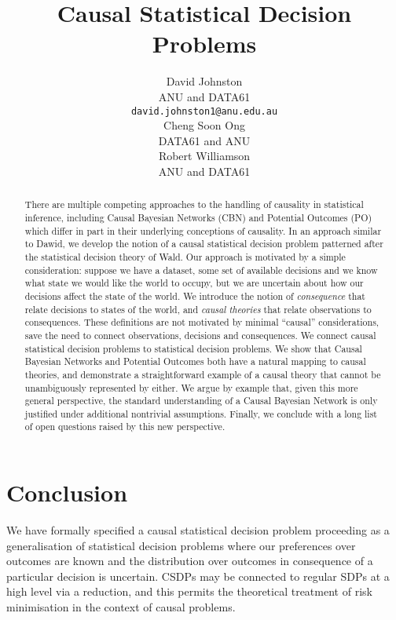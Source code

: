 \documentclass{article}
\title{Causal Statistical Decision Problems}
\author{%
  David Johnston \\
    ANU and DATA61\\
  \texttt{david.johnston1@anu.edu.au} \\
   \And
  Cheng Soon Ong\\
  DATA61 and ANU\\
   \And
   Robert Williamson \\
   ANU and DATA61\\
}
\theoremstyle{plain}
\theoremstyle{definition}
\begin{document}
\maketitle

\begin{abstract}
There are multiple competing approaches to the handling of causality in statistical inference, including Causal Bayesian Networks (CBN) and Potential Outcomes (PO) which differ in part in their underlying conceptions of causality. In an approach similar to Dawid, we develop the notion of a causal statistical decision problem patterned after the statistical decision theory of Wald. Our approach is motivated by a simple consideration: suppose we have a dataset, some set of available decisions and we know what state we would like the world to occupy, but we are uncertain about how our decisions affect the state of the world. We introduce the notion of \emph{consequence } that relate decisions to states of the world, and \emph{causal theories} that relate observations to consequences. These definitions are not motivated by minimal ``causal'' considerations, save the need to connect observations, decisions and consequences. We connect causal statistical decision problems to statistical decision problems. We show that Causal Bayesian Networks and Potential Outcomes both have a natural mapping to causal theories, and demonstrate a straightforward example of a causal theory that cannot be unambiguously represented by either. We argue by example that, given this more general perspective, the standard understanding of a Causal Bayesian Network is only justified under additional nontrivial assumptions. Finally, we conclude with a long list of open questions raised by this new perspective.
\end{abstract}







\section{Conclusion}

We have formally specified a causal statistical decision problem proceeding as a generalisation of statistical decision problems where our preferences over outcomes are known and the distribution over outcomes in consequence of a particular decision is uncertain. CSDPs may be connected to regular SDPs at a high level via a reduction, and this permits the theoretical treatment of risk minimisation in the context of causal problems. 
\end{document}

